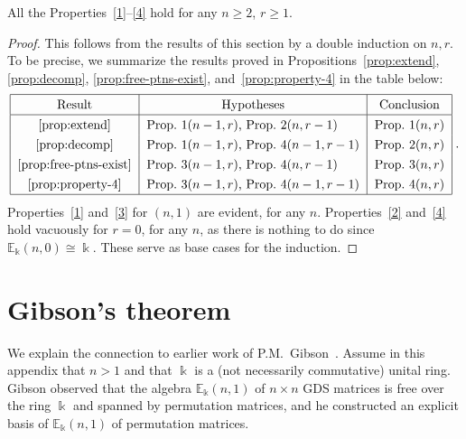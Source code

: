 \documentclass[ALCO,ThmDefs,Unicode,epreuves]{cedram}
\newcommand{\E}{\mathbb{E}}
\begin{document}
\begin{theo}\label{thm:properties}
 All the Properties~\ref{1}--\ref{4} hold for any $n \ge 2$, $r\ge
 1$.
\end{theo}

\begin{proof}
This follows from the results of this section by a double induction on
$n,r$. To be precise, we summarize the results proved in Propositions~\ref{prop:extend}, \ref{prop:decomp}, \ref{prop:free-ptns-exist}, and~\ref{prop:property-4} in the table below:
\[
\renewcommand{\arraystretch}{1.3}
\begin{tabular}{|c|l|c|}
\hline
 Result & \multicolumn{1}{c|}{Hypotheses} & Conclusion \\ \hline
\ref{prop:extend}& Prop.~1$(n-1,r)$, Prop.~2$(n,r-1)$ & Prop.~1$(n,r)$ \\
\ref{prop:decomp}& Prop.~1$(n-1,r)$, Prop.~4$(n-1,r-1)$ & Prop.~2$(n,r)$ \\
\ref{prop:free-ptns-exist}& Prop.~3$(n-1,r)$, Prop.~4$(n,r-1)$ & Prop.~3$(n,r)$ \\
\ref{prop:property-4}& Prop.~3$(n-1,r)$, Prop.~4$(n-1,r-1)$ & Prop.~4$(n,r)$\\ \hline
\end{tabular}\; .
\]
Properties~\ref{1} and~\ref{3} for $(n,1)$ are evident, for any
$n$. Properties~\ref{2} and~\ref{4} hold vacuously for $r=0$, for any
$n$, as there is nothing to do since $\E_\Bbbk(n,0) \cong
\Bbbk$. These serve as base cases for the induction.
\end{proof}





\appendix
\section{Gibson's theorem}\label{sec:Gibson}%
We explain the connection to earlier work of P.M.~Gibson~\cite{Gibson}. Assume in this appendix that $n > 1$ and that $\Bbbk$
is a (not necessarily commutative) unital ring. Gibson observed that
the algebra $\E_\Bbbk(n,1)$ of $n \times n$ GDS matrices is free over
the ring $\Bbbk$ and spanned by permutation matrices, and he
constructed an explicit basis of $\E_\Bbbk(n,1)$ of permutation
matrices.
\end{document}
